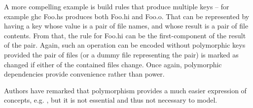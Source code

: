 A more compelling example is build rules that produce multiple keys -- for example \textsf{ghc Foo.hs} produces both \textsf{Foo.hi} and \textsf{Foo.o}. That can be represented by having a key whose value is a pair of file names, and whose result is a pair of file contents. From that, the rule for \textsf{Foo.hi} can be the first-component of the result of the pair. Again, such an operation can be encoded without polymorphic keys provided the pair of files (or a dummy file representing the pair) is marked as changed if either of the contained files change. Once again, polymorphic dependencies provide convenience rather than power.

Authors have remarked that polymorphism provides a much easier expression of concepts, e.g. \citet{hadrian}, but it is not essential and thus not necessary to model.
